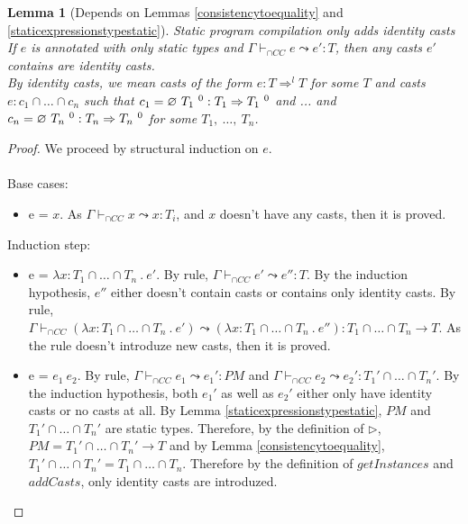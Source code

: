 \documentclass[a4paper]{article}
\newtheorem{lemma}{Lemma}
\begin{document}
\begin{lemma}[Depends on Lemmas \ref{consistencytoequality} and \ref{staticexpressionstypestatic}]
\label{staticcompilation}
Static program compilation only adds identity casts\\
If $e$ is annotated with only static types and $\Gamma \vdash_{\cap CC} e \leadsto e' : T$, then any casts $e'$ contains are identity casts.\\
By identity casts, we mean casts of the form $e : T \Rightarrow^l T$ for some $T$ and casts $e : c_1 \cap \ldots \cap c_n$ such that $c_1 = \varnothing\ T_1\ ^{0} : T_1 \Rightarrow T_1\ ^{0}$ and ... and $c_n = \varnothing\ T_n\ ^{0} : T_n \Rightarrow T_n\ ^{0}$ for some $T_1,\ \ldots,\ T_n$.
\end{lemma}
\begin{proof}
We proceed by structural induction on $e$.\\\\
Base cases:
\begin{itemize}
    \item e = $x$.
    As $\Gamma \vdash_{\cap CC} x \leadsto x : T_i$, and $x$ doesn't have any casts, then it is proved.
\end{itemize}
Induction step:
\begin{itemize}
    \item e = $\lambda x : T_1 \cap \ldots \cap T_n\ .\ e'$.
    By rule, $\Gamma \vdash_{\cap CC} e' \leadsto e'' : T$.
    By the induction hypothesis, $e''$ either doesn't contain casts or contains only identity casts.
    By rule, $\Gamma \vdash_{\cap CC} (\lambda x : T_1 \cap \ldots \cap T_n\ .\ e') \leadsto (\lambda x : T_1 \cap \ldots \cap T_n\ .\ e'') : T_1 \cap \ldots \cap T_n \rightarrow T$.
    As the rule doesn't introduze new casts, then it is proved.
    \item e = $e_1\ e_2$.
    By rule, $\Gamma \vdash_{\cap CC} e_1 \leadsto e_1' : PM$ and $\Gamma \vdash_{\cap CC} e_2 \leadsto e_2' : T_1' \cap \ldots \cap T_n'$.
    By the induction hypothesis, both $e_1'$ as well as $e_2'$ either only have identity casts or no casts at all.
    By Lemma \ref{staticexpressionstypestatic}, $PM$ and $T_1' \cap \ldots \cap T_n'$ are static types.
    Therefore, by the definition of $\rhd$, $PM = T_1' \cap \ldots \cap T_n' \rightarrow T$ and by Lemma \ref{consistencytoequality}, $T_1' \cap \ldots \cap T_n' = T_1 \cap \ldots \cap T_n$.
    Therefore by the definition of $getInstances$ and $addCasts$, only identity casts are introduzed.
\end{itemize}
\end{proof}
\end{document}
